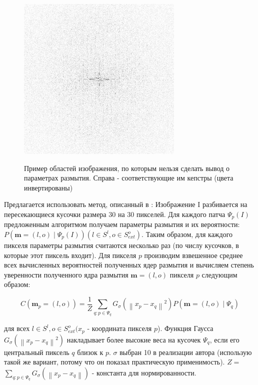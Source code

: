 \begin{figure}[H]
\begin{minipage}[h]{0.45\linewidth}
\end{minipage}
\hfill
\begin{minipage}[h]{0.45\linewidth}
\includegraphics[width=0.5\linewidth, left]{pics/synth_blur/i2.png} \\
\end{minipage}

\caption{Пример областей изображения, по которым нельзя сделать вывод о параметрах размытия. Справа - соответствующие им кепстры (цвета инвертированы)}
\label{ris:bad_ceps}
\end{figure}

Предлагается использовать метод, описанный в \cite{sun}:
Изображение I разбивается на пересекающиеся кусочки размера 30 на 30 пикселей. Для каждого патча $\Psi_{p}(I)$ предложенным алгоритмом получаем параметры размытия и их вероятности: $P\left(\mathbf{m}=(l, o) \mid \Psi_{p}(I)\right)\left(l \in S^{l}, o \in S_{e x t}^{o}\right)$. Таким образом, для каждого пикселя параметры размытия считаются несколько раз (по числу кусочков, в которые этот пиксель входит).
Для пикселя $p$ производим взвешенное среднее всех вычисленных вероятностей полученных ядер размытия и вычисляем степень уверенности полученного ядра размытия $\mathbf{m}=(l, o)$ пикселя $p$ следующим образом:

$$
C\left(\mathbf{m}_{p}=(l, o)\right)= \frac{1}{Z} \sum_{q: p \in \Psi_{q}} G_{\sigma}\left(\left\|x_{p}-x_{q}\right\|^{2}\right) P\left(\mathbf{m}=(l, o) \mid \Psi_{q}\right)
$$

для всех $l \in S^{l}, o \in S_{e x t}^{o} (x_{p}$ - координата пикселя $p$). Функция Гаусса $G_{\sigma}\left(\left\|x_{p}-x_{q}\right\|^{2}\right)$ накладывает более высокие веса на кусочек $\Psi_{q}$, если его центральный пиксель $q$ близок к $p$. $\sigma$ выбран 10 в реализации автора (использую такой же вариант, потому что он показал практическую применимость). $Z=$ $\sum_{q: p \in \Psi_{q}} G_{\sigma}\left(\left\|x_{p}-x_{q}\right\|\right)$ - константа для нормированности.

